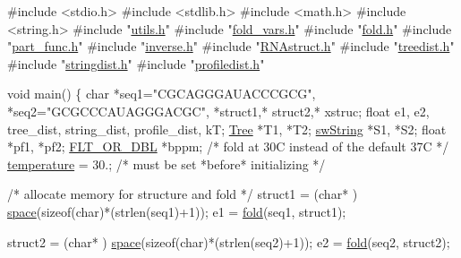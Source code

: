 \begin{DoxyCodeInclude}
\textcolor{preprocessor}{#include  <stdio.h>}
\textcolor{preprocessor}{#include  <stdlib.h>}
\textcolor{preprocessor}{#include  <math.h>}
\textcolor{preprocessor}{#include  <string.h>}
\textcolor{preprocessor}{#include  "\mbox{\hyperlink{utils_8h}{utils.h}}"}
\textcolor{preprocessor}{#include  "\mbox{\hyperlink{fold__vars_8h}{fold\_vars.h}}"}
\textcolor{preprocessor}{#include  "\mbox{\hyperlink{fold_8h}{fold.h}}"}
\textcolor{preprocessor}{#include  "\mbox{\hyperlink{part__func_8h}{part\_func.h}}"}
\textcolor{preprocessor}{#include  "\mbox{\hyperlink{inverse_8h}{inverse.h}}"}
\textcolor{preprocessor}{#include  "\mbox{\hyperlink{RNAstruct_8h}{RNAstruct.h}}"}
\textcolor{preprocessor}{#include  "\mbox{\hyperlink{treedist_8h}{treedist.h}}"}
\textcolor{preprocessor}{#include  "\mbox{\hyperlink{stringdist_8h}{stringdist.h}}"}
\textcolor{preprocessor}{#include  "\mbox{\hyperlink{profiledist_8h}{profiledist.h}}"}

\textcolor{keywordtype}{void} main()
\{
   \textcolor{keywordtype}{char} *seq1=\textcolor{stringliteral}{"CGCAGGGAUACCCGCG"}, *seq2=\textcolor{stringliteral}{"GCGCCCAUAGGGACGC"},
        *struct1,* struct2,* xstruc;
   \textcolor{keywordtype}{float} e1, e2, tree\_dist, string\_dist, profile\_dist, kT;
   \mbox{\hyperlink{structTree}{Tree}} *T1, *T2;
   \mbox{\hyperlink{structswString}{swString}} *S1, *S2;
   \textcolor{keywordtype}{float} *pf1, *pf2;
   \mbox{\hyperlink{group__data__structures_ga31125aeace516926bf7f251f759b6126}{FLT\_OR\_DBL}} *bppm;
   \textcolor{comment}{/* fold at 30C instead of the default 37C */}
   \mbox{\hyperlink{group__model__details_gab4b11c8d9c758430960896bc3fe82ead}{temperature}} = 30.;      \textcolor{comment}{/* must be set *before* initializing  */}

   \textcolor{comment}{/* allocate memory for structure and fold */}
   struct1 = (\textcolor{keywordtype}{char}* ) \mbox{\hyperlink{utils_8h_ad7e1e137b3bf1f7108933d302a7f0177}{space}}(\textcolor{keyword}{sizeof}(\textcolor{keywordtype}{char})*(strlen(seq1)+1));
   e1 =  \mbox{\hyperlink{group__mfe__fold__single_gaadafcb0f140795ae62e5ca027e335a9b}{fold}}(seq1, struct1);

   struct2 = (\textcolor{keywordtype}{char}* ) \mbox{\hyperlink{utils_8h_ad7e1e137b3bf1f7108933d302a7f0177}{space}}(\textcolor{keyword}{sizeof}(\textcolor{keywordtype}{char})*(strlen(seq2)+1));
   e2 =  \mbox{\hyperlink{group__mfe__fold__single_gaadafcb0f140795ae62e5ca027e335a9b}{fold}}(seq2, struct2);


\end{DoxyCodeInclude}
